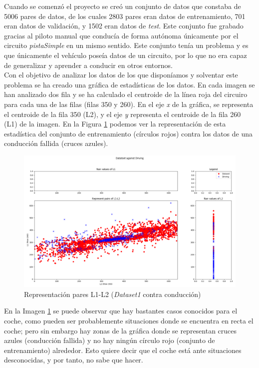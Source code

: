 Cuando se comenzó el proyecto se creó un conjunto de datos que constaba de 5006 pares de datos, de los cuales 2803 pares eran datos de entrenamiento, 701 eran datos de validación, y 1502 eran datos de \textit{test}. Este conjunto fue grabado gracias al piloto manual que conducía de forma autónoma únicamente por el circuito \textit{pistaSimple} en un mismo sentido. Este conjunto tenía un problema y es que únicamente el vehículo poseía datos de un circuito, por lo que no era capaz de generalizar y aprender a conducir en otros entornos.\\

Con el objetivo de analizar los datos de los que disponíamos y solventar este problema se ha creado una gráfica de estadísticas de los datos. En cada imagen se han analizado dos fila y se ha calculado el centroide de la línea roja del circuiro para cada una de las filas (filas 350 y 260). En el eje \textit{x} de la gráfica, se representa el centroide de la fila 350 (L2), y el eje \textit{y} representa el centroide de la fila 260 (L1) de la imagen. En la Figura \ref{fig.L1_L2_dataset1} podemos ver la representación de esta estadística del conjunto de entrenamiento (círculos rojos) contra los datos de una conducción fallida (cruces azules).\\


\begin{figure}
  \begin{center}
    \includegraphics[width=1\textwidth]{figures/Infraestructura/L1_L2_dataset1_driving.png}
		\caption{Representación pares L1-L2 (\textit{Dataset1} contra conducción)}
		\label{fig.L1_L2_dataset1}
		\end{center}
\end{figure}

En la Imagen \ref{fig.L1_L2_dataset1} se puede observar que hay bastantes casos conocidos para el coche, como pueden ser probablemente situaciones donde se encuentra en recta el coche; pero sin embargo hay zonas de la gráfica donde se representan cruces azules (conducción fallida) y no hay ningún círculo rojo (conjunto de entrenamiento) alrededor. Esto quiere decir que el coche está ante situaciones desconocidas, y por tanto, no sabe que hacer. \\

